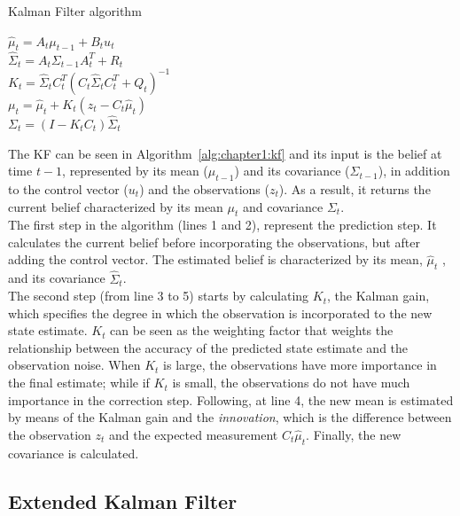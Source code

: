 \begin{algorithm}[h]
    \caption{Kalman Filter algorithm}
    \label{alg:chapter1:kf}

    \BlankLine
    \BlankLine
    $\hat\mu_t = A_t \mu_{t-1} + B_t u_t$ \\
    $\hat\Sigma_t = A_t \Sigma_{t-1} A_t^T + R_t$ \\
    \BlankLine
    $K_t = \hat\Sigma_t C_t^T \left(C_t \hat\Sigma_t C_t^T + Q_t\right)^{-1}$ \\
    $\mu_t = \hat\mu_t + K_t \left(z_t - C_t \hat\mu_t \right) $ \\
    $\Sigma_t = (I - K_t C_t) \hat\Sigma_t$ \\
    \BlankLine
\end{algorithm}

The KF can be seen in Algorithm~\ref{alg:chapter1:kf} and its input is the belief at time $t-1$, represented by its mean ($\mu_{t-1}$) and its covariance ($\Sigma_{t-1}$), in addition to the control vector ($u_t$) and the observations ($z_t$). As a result, it returns the current belief characterized by its mean $\mu_t$ and covariance $\Sigma_t$. \\

The first step in the algorithm (lines 1 and 2), represent the prediction step. It calculates the current belief before incorporating the observations, but after adding the control vector. The estimated belief is characterized by its mean, $\hat\mu_t$ , and its covariance $\hat\Sigma_t$.\\

The second step (from line 3 to 5) starts by calculating $K_t$, the Kalman gain, which specifies the degree in which the observation is incorporated to the new state estimate. $K_t$ can be seen as the weighting factor that weights the relationship between the accuracy of the predicted state estimate and the observation noise. When $K_t$ is large, the observations have more importance in the final estimate; while if $K_t$ is small, the observations do not have much importance in the correction step. Following, at line 4, the new mean is estimated by means of the Kalman gain and the \emph{innovation}, which is the difference between the observation $z_t$ and the expected measurement $C_t \hat\mu_t$. Finally, the new covariance is calculated.

\subsection{Extended Kalman Filter}
\label{subsec:chapter1:kf:ekf}

